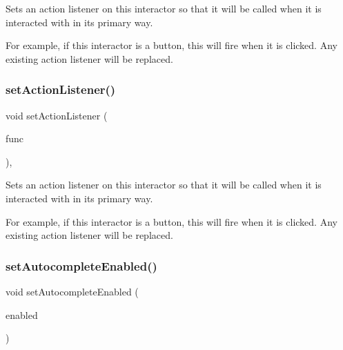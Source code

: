 Sets an action listener on this interactor so that it will be called when it is interacted with in its primary way. 

For example, if this interactor is a button, this will fire when it is clicked. Any existing action listener will be replaced. \mbox{\label{classsgl_1_1GInteractor_aebd20a89c7a8a43a6fce999cf4f9fcf2}} 
\subsubsection{\texorpdfstring{set\+Action\+Listener()}{setActionListener()}\hspace{0.1cm}{\footnotesize\ttfamily [2/2]}}
{\footnotesize\ttfamily void set\+Action\+Listener (\begin{DoxyParamCaption}\item[{\mbox{\hyperlink{namespacesgl_a54427ce97bb1c2804e4fe2b0a62e8b17}{G\+Event\+Listener\+Void}}}]{func }\end{DoxyParamCaption})\hspace{0.3cm}{\ttfamily [virtual]}, {\ttfamily [inherited]}}



Sets an action listener on this interactor so that it will be called when it is interacted with in its primary way. 

For example, if this interactor is a button, this will fire when it is clicked. Any existing action listener will be replaced. \mbox{\label{classsgl_1_1GTextField_a173f724f6099be5a2ed423baf3433b83}} 
\subsubsection{\texorpdfstring{set\+Autocomplete\+Enabled()}{setAutocompleteEnabled()}}
{\footnotesize\ttfamily void set\+Autocomplete\+Enabled (\begin{DoxyParamCaption}\item[{bool}]{enabled }\end{DoxyParamCaption})\hspace{0.3cm}{\ttfamily [virtual]}}



